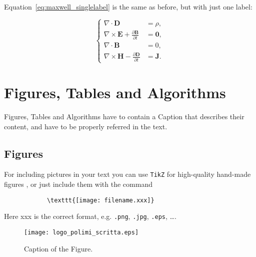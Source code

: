\documentclass[11pt,a4paper]{article}
\begin{document}
    Equation~\eqref{eq:maxwell_singlelabel} is the same as before,
    but with just one label:

    \begin{equation}
        \label{eq:maxwell_singlelabel}
        \left\{
        \begin{aligned}
            \nabla\cdot \bm{D} & = \rho, \\
            \nabla \times \bm{E} +  \frac{\partial \bm{B}}{\partial t} &= \bm{0},\\
            \nabla\cdot \bm{B} & = 0, \\
            \nabla \times \bm{H} - \frac{\partial \bm{D}}{\partial t} &= \bm{J}.
        \end{aligned}
        \right.
    \end{equation}

\section{Figures, Tables and Algorithms}

    Figures, Tables and Algorithms have to contain a Caption that describes their content, and have to be properly referred in the text.

    \subsection{Figures} \label{subsec:figures}

        For including pictures in your text you can use \texttt{TikZ} for high-quality hand-made figures \cite{tikz}, or just include them with the command

        \begin{verbatim}
            \texttt{[image: filename.xxx]}
        \end{verbatim}

        Here xxx is the correct format, e.g.  \verb|.png|, \verb|.jpg|, \verb|.eps|, \dots.

        \begin{figure}[H]
            \centering
            \texttt{[image: logo\_polimi\_scritta.eps]}
            \caption{Caption of the Figure.}
            \label{fig:quadtree}
        \end{figure}
\end{document}
